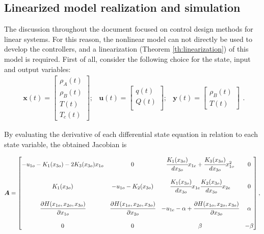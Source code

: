 \documentclass[a4paper,11pt]{book}
\numberwithin{figure}{chapter}
\numberwithin{equation}{chapter}
\numberwithin{table}{chapter}
\theoremstyle{definition}
\begin{document}
\subsection{Linearized model realization and simulation}

The discussion throughout the document focused on control design methods for linear systems. For this reason, the nonlinear model can not directly be used to develop the controllers, and a linearization (Theorem \ref{th:linearization}) of this model is required. First of all, consider the following choice for the state, input and output variables:
\begin{equation}
\begin{matrix}
	\bm{x}(t) = \begin{bmatrix}
		\rho_A(t) \\ 
		\rho_B(t) \\ 
		T(t) \\ 
		T_c(t)
	\end{bmatrix}; & \bm{u}(t) = \begin{bmatrix}
		q(t) \\ 
		Q(t) \\
	\end{bmatrix}; & \bm{y}(t) = \begin{bmatrix}
		\rho_B(t) \\ 
		T(t)
	\end{bmatrix}
\end{matrix}
.\end{equation}

By evaluating the derivative of each differential state equation in relation to each state variable, the obtained Jacobian is

\begin{equation} \label{eq:exoLinSS01}
	\bm{A} = \begin{bmatrix}
		-u_{1o} - K_1(x_{3o}) - 2K_3(x_{3o}) x_{1o} & 0 & \cfrac{K_1(x_{3o})}{d x_{3o}} x_{1e} + \cfrac{K_3(x_{3o})}{d x_{3o}} x_{1o}^2 & 0 \\ \\
		K_1(x_{3o}) 					 & -u_{1o} - K_2(x_{3o}) & \cfrac{K_1(x_{3o})}{d x_{3o}} x_{1e} \cfrac{K_2(x_{3o})}{d x_{3o}} x_{2e} & 0 \\ \\
		\cfrac{\partial H(x_{1o},x_{2o},x_{3o})}{\partial x_{1o}} & \cfrac{\partial H(x_{1o},x_{2o},x_{3o})}{\partial x_{2o}} & -u_{1e} - \alpha + \cfrac{\partial H(x_{1o},x_{2o},x_{3o})}{\partial x_{3o}} & \alpha \\ \\
		0 & 0 & \beta & -\beta \\
	\end{bmatrix}
,\end{equation} 
\end{document}
